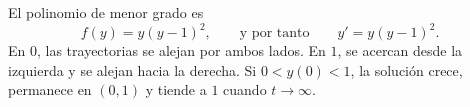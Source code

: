 El polinomio de menor grado es
\[
f(y)=y(y-1)^2,\qquad\text{y por tanto}\qquad y'=y(y-1)^2.
\]
En \(0\), las trayectorias se alejan por ambos lados. En \(1\), se acercan desde la izquierda y se alejan hacia la derecha. Si \(0<y(0)<1\), la solución crece, permanece en \((0,1)\) y tiende a \(1\) cuando \(t\to\infty\).
